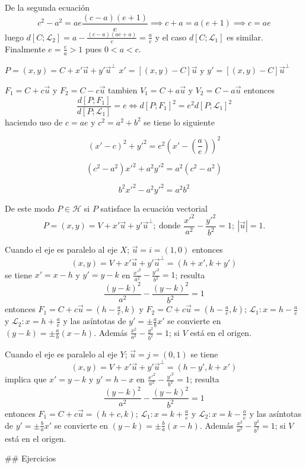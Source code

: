 \documentclass[10pt,]{krantz}
\theoremstyle{definition}
\theoremstyle{definition}
\theoremstyle{definition}
\theoremstyle{remark}
\begin{document}
De la segunda ecuación \[c^2-a^2=ae\frac{(c-a)(e+1)}{e}\implies c+a=a(e+1)\implies c=ae\] luego \(d\left[C;\mathcal{L}_2\right]=a-\frac{(c-a)(ae+a)}{e}=\frac{a}{e}\) y el caso \(d\left[C;\mathcal{L}_1\right]\) es similar. Finalmente \(e=\frac{c}{a}>1\) pues \(0<a<c.\)

\(P=(x,y)=C+x'\vec{u}+y'\vec{u}^\perp\) \(x'=[(x,y)-C]\vec{u}\) y \(y'=[(x,y)-C]\vec{u}^\perp\)

\(F_1=C+c\vec{u}\) y \(F_2=C-c\vec{u}\) tambien \(V_1=C+a\vec{u}\) y \(V_2=C-a\vec{u}\) entonces \[\frac{d\left[P;F_1\right]}{d\left[P;\mathcal{L}_1\right]}=e\iff d\left[P;F_1\right]^2=e^2d\left[P;\mathcal{L}_1\right]^2\] haciendo uso de \(c=ae\) y \(c^2=a^2+b^2\) se tiene lo siguiente

\[(x'-c)^2+y'^2=e^2\left(x'-\left(\frac{a}{e}\right)\right)^2\]

\[(c^2-a^2) x'^2+a^2y'^2=a^2(c^2-a^2)\]

\[b^2x'^2-a^2y'^2=a^2b^2\]

De este modo \(P\in\mathcal{H}\) si \(P\) satisface la ecuación vectorial \[P=(x,y)=V+x'\vec{u}+y'\vec{u}^\perp;\: \text{donde } \frac{x'^2}{a^2}-\frac{y'^2}{b^2}=1; \:\left|\vec{u}\right|=1.\]

Cuando el eje es paralelo al eje \(X\); \(\vec{u}=i=(1,0)\) entonces \[(x,y)=V+x'\vec{u}+y'\vec{u}^\perp=(h+x',k+y')\] se tiene \(x'=x-h\) y \(y'=y-k\) en \(\frac{x'^2}{a^2}-\frac{y'^2}{b^2}=1\); resulta \[\frac{(y-k)^2}{a^2}-\frac{(y-k)^2}{b^2}=1\] entonces \(F_1=C+c\vec{u}=(h-\frac{a}{e},k)\) y \(F_2=C+c\vec{u}=(h-\frac{a}{e},k)\); \(\mathcal{L}_1: x=h-\frac{a}{e}\) y \(\mathcal{L}_2: x=h+\frac{a}{e}\) y las asíntotas de \(y'=\pm\frac{a}{b}x'\) se convierte en \((y-k)=\pm\frac{a}{b}(x-h)\). Además \(\frac{x^2}{a^2}-\frac{y^2}{b^2}=1\); si \(V\) está en el origen.

Cuando el eje es paralelo al eje \(Y\); \(\vec{u}=j=(0,1)\) se tiene \[(x,y)=V+x'\vec{u}+y'\vec{u}^\perp=(h-y',k+x')\] implica que \(x'=y-k\) y \(y'=h-x\) en \(\frac{x'^2}{a^2}-\frac{y'^2}{b^2}=1\); resulta \[\frac{(y-k)^2}{a^2}-\frac{(y-k)^2}{b^2}=1\] entonces \(F_1=C+c\vec{u}=(h+c,k)\); \(\mathcal{L}_1: x=k+\frac{a}{e}\) y \(\mathcal{L}_2: x=k-\frac{a}{e}\) y las asíntotas de \(y'=\pm\frac{b}{a}x'\) se convierte en \((y-k)=\pm\frac{b}{a}(x-h)\). Además \(\frac{x^2}{a^2}-\frac{y^2}{b^2}=1\); si \(V\) está en el origen.

\citep{vincze2014college}
\#\# Ejercicios

\hypertarget{appendix-apendice}{%
\appendix {}}
\end{document}
